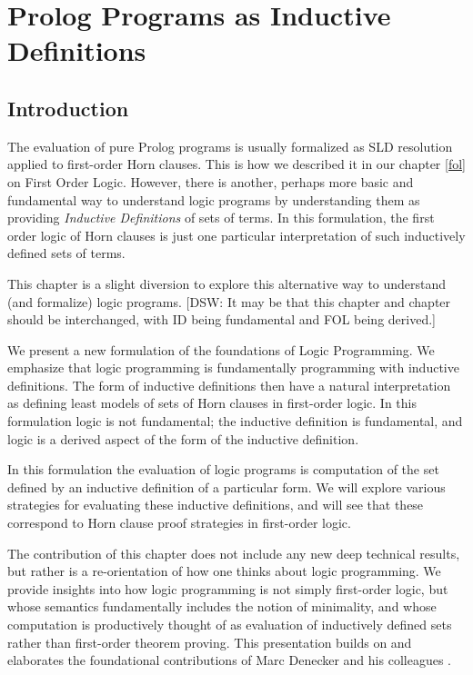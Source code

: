 \chapter{Prolog Programs as Inductive Definitions}

\section{Introduction}
The evaluation of pure Prolog programs is usually formalized as SLD
resolution applied to first-order Horn clauses.  This is how we
described it in our chapter \ref{fol} on First Order Logic.  However,
there is another, perhaps more basic and fundamental way to understand
logic programs by understanding them as providing {\em Inductive
  Definitions} of sets of terms.  In this formulation, the first order
logic of Horn clauses is just one particular interpretation of such
inductively defined sets of terms.

This chapter is a slight diversion to explore this alternative way to
understand (and formalize) logic programs. [DSW: It may be that this
  chapter and chapter should be interchanged, with ID being
  fundamental and FOL being derived.]

We present a new formulation of the foundations of Logic
Programming.  We emphasize that logic programming is fundamentally
programming with inductive definitions.  The form of inductive
definitions then have a natural interpretation as defining least
models of sets of Horn clauses in first-order logic.  In this
formulation logic is not fundamental; the inductive definition is
fundamental, and logic is a derived aspect of the form of the
inductive definition.

In this formulation the evaluation of logic programs is computation of
the set defined by an inductive definition of a particular form.  We
will explore various strategies for evaluating these inductive
definitions, and will see that these correspond to Horn clause proof
strategies in first-order logic.

The contribution of this chapter does not include any new deep
technical results, but rather is a re-orientation of how one thinks
about logic programming.  We provide insights into how logic
programming is not simply first-order logic, but whose semantics
fundamentally includes the notion of minimality, and whose computation
is productively thought of as evaluation of inductively defined sets
rather than first-order theorem proving.  This presentation builds on
and elaborates the foundational contributions of Marc Denecker and his
colleagues \cite{...}.


